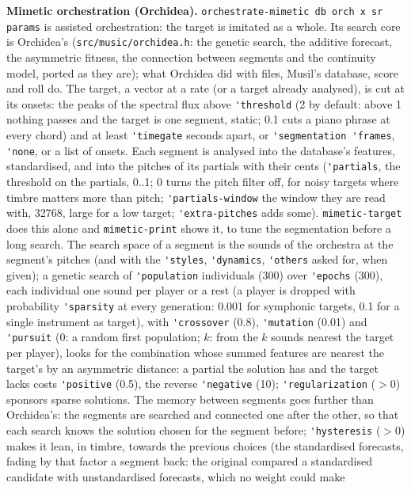 \documentclass[11pt,a4paper]{article}
\newcommand{\musil}[1]{\lstinline[style=musilinline]{#1}}
\begin{document}
\textbf{Mimetic orchestration (Orchidea).} \musil{orchestrate-mimetic db orch x sr params}
is assisted orchestration: the target is imitated as a whole. Its search core is Orchidea's
(\texttt{src/music/orchidea.h}: the genetic search, the additive forecast, the asymmetric
fitness, the connection between segments and the continuity model, ported as they are);
what Orchidea did with files, Musil's database, score and roll do. The target, a vector at
a rate (or a target already analysed), is cut at its onsets: the peaks of the spectral flux
above \musil{'threshold} (2 by default: above 1 nothing passes and the target is one
segment, static; 0.1 cuts a piano phrase at every chord) and at least \musil{'timegate}
seconds apart, or \musil{'segmentation 'frames}, \musil{'none}, or a list of onsets.
Each segment is analysed into the database's features, standardised, and into the pitches
of its partials with their cents (\musil{'partials}, the threshold on the partials, 0..1;
0 turns the pitch filter off, for noisy targets where timbre matters more than pitch;
\musil{'partials-window} the window they are read with, 32768, large for a low target;
\musil{'extra-pitches} adds some). \musil{mimetic-target} does this alone and
\musil{mimetic-print} shows it, to tune the segmentation before a long search. The search
space of a segment is the sounds of the orchestra at the segment's pitches (and with the
\musil{'styles}, \musil{'dynamics}, \musil{'others} asked for, when given); a genetic
search of \musil{'population} individuals (300) over \musil{'epochs} (300), each individual
one sound per player or a rest (a player is dropped with probability \musil{'sparsity} at
every generation: 0.001 for symphonic targets, 0.1 for a single instrument as target), with
\musil{'crossover} (0.8), \musil{'mutation} (0.01) and \musil{'pursuit} (0: a random first
population; $k$: from the $k$ sounds nearest the target per player), looks for the
combination whose summed features are nearest the target's by an asymmetric distance: a
partial the solution has and the target lacks costs \musil{'positive} (0.5), the reverse
\musil{'negative} (10); \musil{'regularization} ($>0$) sponsors sparse solutions.
The memory between segments goes further than Orchidea's: the segments are searched and
connected one after the other, so that each search knows the solution chosen for the
segment before; \musil{'hysteresis} ($>0$) makes it lean, in timbre, towards the previous
choices (the standardised forecasts, fading by that factor a segment back: the original
compared a standardised candidate with unstandardised forecasts, which no weight could make
\end{document}
